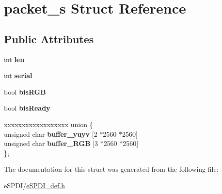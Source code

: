 \hypertarget{structpacket__s}{}\section{packet\+\_\+s Struct Reference}
\label{structpacket__s}
\subsection*{Public Attributes}
\begin{DoxyCompactItemize}
\item 
\mbox{\label{structpacket__s_ad68be5bc3eb25c3b39ae20bf7b8da32e}} 
int {\bfseries len}
\item 
\mbox{\label{structpacket__s_a1e05f635169f2aaa0a8b6fa2c3f0c83b}} 
int {\bfseries serial}
\item 
\mbox{\label{structpacket__s_a7365d8d8913c1835290c0130b4634f7b}} 
bool {\bfseries bis\+R\+GB}
\item 
\mbox{\label{structpacket__s_ada6130eb1c9b43a18707b485a7212205}} 
bool {\bfseries bis\+Ready}
\item 
\mbox{\label{structpacket__s_aa9a3486b6c6d4a2fab1dc4f8fb9ecb36}} 
\begin{tabbing}
xx\=xx\=xx\=xx\=xx\=xx\=xx\=xx\=xx\=\kill
union \{\\
\>unsigned char {\bfseries buffer\_yuyv} \mbox{[}2 $\ast$2560 $\ast$2560\mbox{]}\\
\>unsigned char {\bfseries buffer\_RGB} \mbox{[}3 $\ast$2560 $\ast$2560\mbox{]}\\
\}; \\

\end{tabbing}\end{DoxyCompactItemize}


The documentation for this struct was generated from the following file\+:\begin{DoxyCompactItemize}
\item 
e\+S\+P\+D\+I/\hyperlink{e_s_p_d_i__def_8h}{e\+S\+P\+D\+I\+\_\+def.\+h}\end{DoxyCompactItemize}

